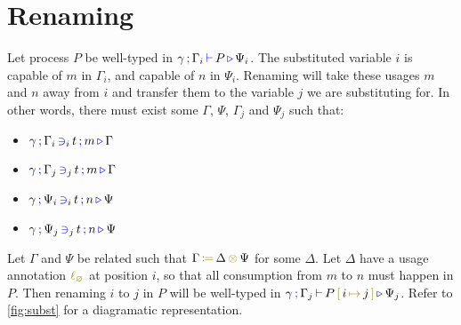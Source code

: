 \section{Renaming}
\label{app:renaming-generalization}

\begin{nitheorem}
  \label{thm:subst-generalization1}
  Let process $P$ be well-typed in $\types{\gamma}{\Gamma_i}{P}{\Psi_i}$.
  The substituted variable $i$ is capable of $m$ in $\Gamma_i$, and capable of $n$ in $\Psi_i$.
  Renaming will take these usages $m$ and $n$ away from $i$ and transfer them to the variable $j$ we are substituting for.
  In other words, there must exist some $\Gamma$, $\Psi$, $\Gamma_j$ and $\Psi_j$ such that:
  \begin{multicols}{2}
  \begin{itemize}
    \item $\contains{\gamma}{\Gamma_i}{i}{t}{m}{\Gamma}$
    \item $\contains{\gamma}{\Gamma_j}{j}{t}{m}{\Gamma}$
    \item $\contains{\gamma}{\Psi_i}{i}{t}{n}{\Psi}$
    \item $\contains{\gamma}{\Psi_j}{j}{t}{n}{\Psi}$
  \end{itemize}
  \end{multicols}
  Let $\Gamma$ and $\Psi$ be related such that $\opctx{\Gamma}{\Delta}{\Psi}$ for some $\Delta$.
  Let $\Delta$ have a usage annotation $\lz$ at position $i$, so that all consumption from $m$ to $n$ must happen in $P$.
  Then renaming $i$ to $j$ in $P$ will be well-typed in $\types{\gamma}{\Gamma_j}{\subst{P}{j}{i}}{\Psi_j}$.
  Refer to \autoref{fig:subst} for a diagramatic representation.
\end{nitheorem}


